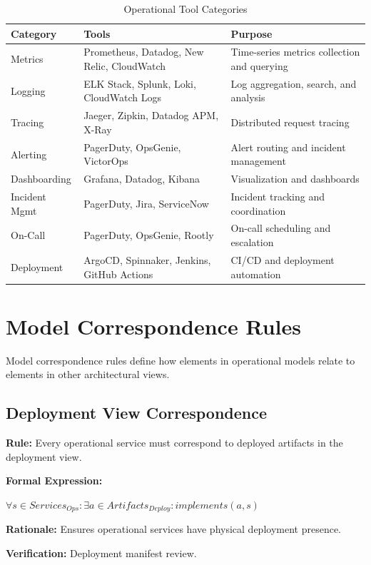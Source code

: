 \documentclass[11pt,letterpaper]{article}
\begin{document}
\begin{table}[H]
\centering
\caption{Operational Tool Categories}
\small
\begin{tabular}{@{}L{2.8cm}L{4cm}L{6.5cm}@{}}
\toprule
\textbf{Category} & \textbf{Tools} & \textbf{Purpose} \\
\midrule
Metrics & Prometheus, Datadog, New Relic, CloudWatch & Time-series metrics collection and querying \\
\addlinespace
Logging & ELK Stack, Splunk, Loki, CloudWatch Logs & Log aggregation, search, and analysis \\
\addlinespace
Tracing & Jaeger, Zipkin, Datadog APM, X-Ray & Distributed request tracing \\
\addlinespace
Alerting & PagerDuty, OpsGenie, VictorOps & Alert routing and incident management \\
\addlinespace
Dashboarding & Grafana, Datadog, Kibana & Visualization and dashboards \\
\addlinespace
Incident Mgmt & PagerDuty, Jira, ServiceNow & Incident tracking and coordination \\
\addlinespace
On-Call & PagerDuty, OpsGenie, Rootly & On-call scheduling and escalation \\
\addlinespace
Deployment & ArgoCD, Spinnaker, Jenkins, GitHub Actions & CI/CD and deployment automation \\
\bottomrule
\end{tabular}
\end{table}

\section{Model Correspondence Rules}

Model correspondence rules define how elements in operational models relate to elements in other architectural views.

\subsection{Deployment View Correspondence}

\begin{definitionbox}
\textbf{Rule:} Every operational service must correspond to deployed artifacts in the deployment view.

\textbf{Formal Expression:}
\begin{center}
$\forall s \in Services_{Ops} : \exists a \in Artifacts_{Deploy} : implements(a, s)$
\end{center}

\textbf{Rationale:} Ensures operational services have physical deployment presence.

\textbf{Verification:} Deployment manifest review.
\end{definitionbox}
\end{document}
